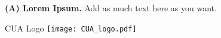 
{\textbf{(A) Lorem Ipsum.} Add as much text here as you want.}

\begin{Mfigure}{CUA Logo}
 \centering
 \texttt{[image: CUA\_logo.pdf]}
\label{fig:titlepagelogo}
\end{Mfigure}
